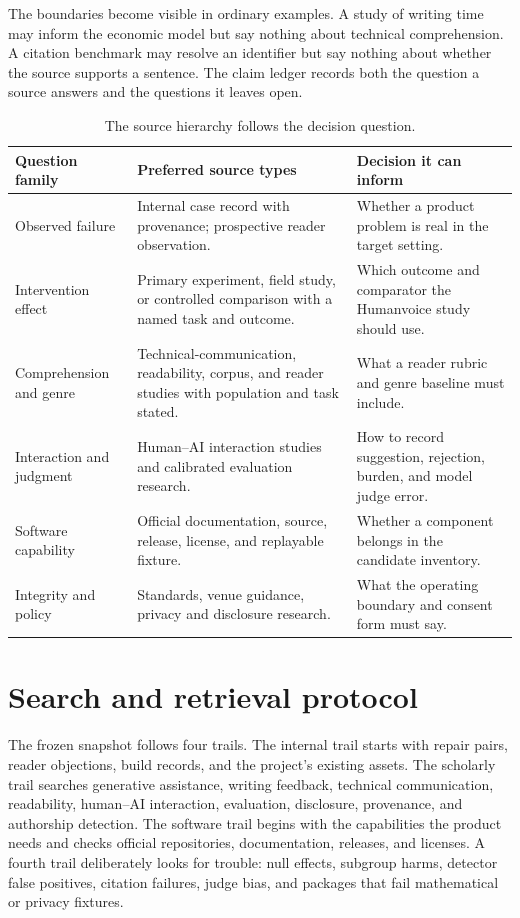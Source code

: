 The boundaries become visible in ordinary examples. A study of writing time
may inform the economic model but say nothing about technical comprehension. A
citation benchmark may resolve an identifier but say nothing about whether the
source supports a sentence. The claim ledger records both the question a source
answers and the questions it leaves open.

\begin{table}[H]
\centering
\small
\begin{tabularx}{\textwidth}{@{}p{}p{}L@{}}
\toprule
Question family & Preferred source types & Decision it can inform \\
\midrule
Observed failure & Internal case record with provenance; prospective reader
observation. & Whether a product problem is real in the target setting. \\
Intervention effect & Primary experiment, field study, or controlled
comparison with a named task and outcome. & Which outcome and comparator the
Humanvoice study should use. \\
Comprehension and genre & Technical-communication, readability, corpus, and
reader studies with population and task stated. & What a reader rubric and
genre baseline must include. \\
Interaction and judgment & Human--AI interaction studies and calibrated
evaluation research. & How to record suggestion, rejection, burden, and model
judge error. \\
Software capability & Official documentation, source, release, license, and
replayable fixture. & Whether a component belongs in the candidate inventory. \\
Integrity and policy & Standards, venue guidance, privacy and disclosure
research. & What the operating boundary and consent form must say. \\
\bottomrule
\end{tabularx}
\caption{The source hierarchy follows the decision question.}
\label{tab:method-question-sources}
\end{table}

\section{Search and retrieval protocol}
\label{sec:method-search}

The frozen snapshot follows four trails. The internal trail starts with repair
pairs, reader objections, build records, and the project's existing assets.
The scholarly trail searches generative assistance, writing feedback, technical
communication, readability, human--AI interaction, evaluation, disclosure,
provenance, and authorship detection. The software trail begins with the
capabilities the product needs and checks official repositories, documentation,
releases, and licenses. A fourth trail deliberately looks for trouble: null
effects, subgroup harms, detector false positives, citation failures, judge
bias, and packages that fail mathematical or privacy fixtures.

